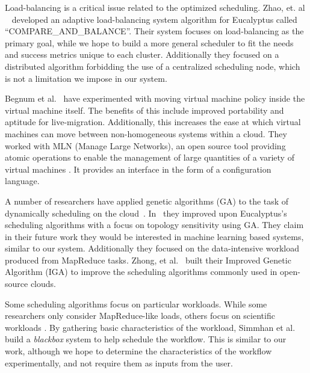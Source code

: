 Load-balancing is a critical issue related to the optimized scheduling.  Zhao,
et. al ~\cite{Zhao} developed an adaptive load-balancing system algorithm for
Eucalyptus called ``COMPARE\_AND\_BALANCE''.  Their system focuses on
load-balancing as the primary goal, while we hope to build a more general
scheduler to fit the needs and success metrics unique to each cluster.  Additionally they focused on a distributed
algorithm forbidding the use of a centralized scheduling node, which is not a
limitation we impose in our system.


Begnum et al.~\cite{Begnum} have experimented with moving virtual machine policy
inside the virtual machine itself.  The benefits of this include improved
portability and aptitude for live-migration.  Additionally, this increases the
ease at which virtual machines can move between non-homogeneous systems within a
cloud.  They worked with MLN (Manage Large Networks), an open source tool
providing atomic operations to enable the management of large quantities of a
variety of virtual machines \cite{Xen,UML,VMware}.  It provides an interface in
the form of a configuration language.


A number of researchers have applied genetic algorithms (GA) to the task of
dynamically scheduling on the cloud~\cite{Lee,Zhong,Chenhong}.  In~\cite{Lee}
they improved upon Eucalyptus's scheduling algorithms with a focus on topology
sensitivity using GA.  They claim in their future work they would be interested
in machine learning based systems, similar to our system.  Additionally they
focused on the data-intensive workload produced from MapReduce tasks. Zhong, et
al.~\cite{Zhong} built their Improved Genetic Algorithm (IGA) to improve the
scheduling algorithms commonly used in open-source clouds.


Some scheduling algorithms focus on particular workloads.  While some
researchers only consider MapReduce-like loads, others focus on scientific
workloads \cite{Juve,Simmhan,Hoffa}.  By gathering basic characteristics of the
workload, Simmhan et al.~\cite{Simmhan} build a \emph{blackbox} system to help
schedule the workflow.  This is similar to our work, although we hope to
determine the characteristics of the workflow experimentally, and not require
them as inputs from the user.
